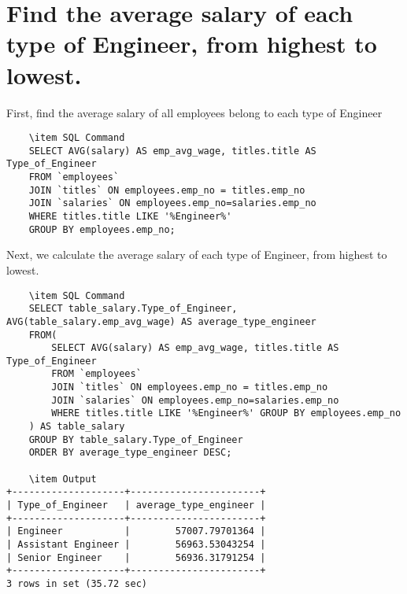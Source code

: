 \documentclass[13pt,a4paper]{report}
\begin{document}
\section{ Find the average salary of each type of Engineer, from highest to lowest. }
\begin{itemize}
First, find the average salary of all employees belong to each type of Engineer
\begin{lstlisting}
	\item SQL Command
	SELECT AVG(salary) AS emp_avg_wage, titles.title AS Type_of_Engineer 
	FROM `employees` 
	JOIN `titles` ON employees.emp_no = titles.emp_no
	JOIN `salaries` ON employees.emp_no=salaries.emp_no 
	WHERE titles.title LIKE '%Engineer%' 
	GROUP BY employees.emp_no;
\end{lstlisting}
Next, we calculate the average salary of each type of Engineer, from highest to lowest.
\begin{lstlisting}
	\item SQL Command
	SELECT table_salary.Type_of_Engineer, AVG(table_salary.emp_avg_wage) AS average_type_engineer 
	FROM(
		SELECT AVG(salary) AS emp_avg_wage, titles.title AS Type_of_Engineer 
		FROM `employees` 
		JOIN `titles` ON employees.emp_no = titles.emp_no 
		JOIN `salaries` ON employees.emp_no=salaries.emp_no 
		WHERE titles.title LIKE '%Engineer%' GROUP BY employees.emp_no
	) AS table_salary 
	GROUP BY table_salary.Type_of_Engineer 
	ORDER BY average_type_engineer DESC;

	\item Output
+--------------------+-----------------------+
| Type_of_Engineer   | average_type_engineer |
+--------------------+-----------------------+
| Engineer           |        57007.79701364 |
| Assistant Engineer |        56963.53043254 |
| Senior Engineer    |        56936.31791254 |
+--------------------+-----------------------+
3 rows in set (35.72 sec)

\end{lstlisting}
\end{itemize}
\end{document}
